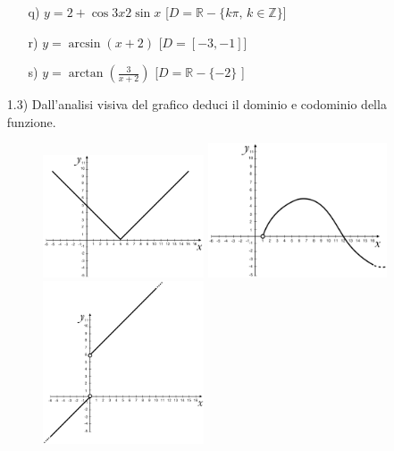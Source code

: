\begin{itemize}
\begin{itemize}
\item[q)]$y={2+\cos{3x}}{2\sin{x}}$   \hfill  
   [$D=\mathbb{R}-\{k\pi,\,k\in \mathbb{Z}\}$]
  \item[r)] $y=\arcsin(x+2)$  
   \hfill  [$D=[-3, -1]$]
  
\item[s)]$y=\arctan(\frac{3}{x+2}) $  \hfill  
   [$D=\mathbb{R}-\{-2\}$ ]\\

  \end{itemize}
  \item[1.3)] Dall'analisi visiva del grafico deduci il 
dominio e codominio della funzione.
  \begin{figure}[htpb!]
  \centering
  
\includegraphics[width=0.45\textwidth]{img/funz_16.png}\quad  
  
\includegraphics[width=0.5\textwidth]{img/funz_17.png}  
  
\quad\includegraphics[width=0.45\textwidth]{img/funz_17a.png}   
  

\end{figure}
\end{itemize}

